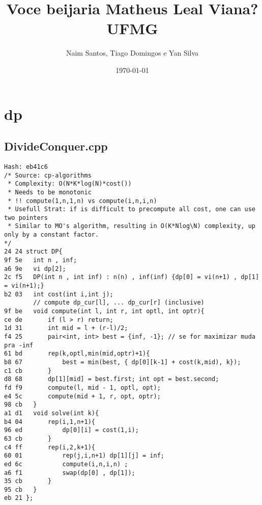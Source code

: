 \documentclass[11pt, a4paper, twoside]{article}
\title{Voce beijaria Matheus Leal Viana? \\ UFMG}
\author{Naim Santos, Tiago Domingos e Yan Silva}
\begin{document}
\twocolumn
\date{\today}
\maketitle


\renewcommand{\contentsname}{Índice} %
\tableofcontents


%
%

\section{dp}

\subsection{DivideConquer.cpp}
\begin{lstlisting}
Hash: eb41c6
/* Source: cp-algorithms
 * Complexity: O(N*K*log(N)*cost())
 * Needs to be monotonic
 * !! compute(1,n,1,n) vs compute(i,n,i,n)  
 * Usefull Strat: if is difficult to precompute all cost, one can use two pointers
 * Similar to MO's algorithm, resulting in O(K*Nlog\N) complexity, up only by a constant factor.
*/
24 24 struct DP{
9f 5e 	int n , inf; 
a6 9e 	vi dp[2];
2c f5 	DP(int n , int inf) : n(n) , inf(inf) {dp[0] = vi(n+1) , dp[1] = vi(n+1);}
b2 03 	int cost(int i,int j);
      	// compute dp_cur[l], ... dp_cur[r] (inclusive) 
9f be 	void compute(int l, int r, int optl, int optr){
ce de 	    if (l > r) return;
1d 31 	    int mid = l + (r-l)/2;
f4 25 	    pair<int, int> best = {inf, -1}; // se for maximizar muda pra -inf
61 bd 	    rep(k,optl,min(mid,optr)+1){
b8 67 	        best = min(best, { dp[0][k-1] + cost(k,mid), k});
c1 cb 	    }
d8 68 	    dp[1][mid] = best.first; int opt = best.second;
fd f9 	    compute(l, mid - 1, optl, opt);
e4 5c 	    compute(mid + 1, r, opt, optr);
98 cb 	}
a1 d1 	void solve(int k){
b4 04 		rep(i,1,n+1){
96 ed 			dp[0][i] = cost(1,i);
63 cb 		}
c4 ff 		rep(i,2,k+1){
60 01 			rep(j,i,n+1) dp[1][j] = inf;
ed 6c 			compute(i,n,i,n) ;
a6 f1 			swap(dp[0] , dp[1]);
35 cb 		}
95 cb 	}
eb 21 };
\end{lstlisting}
\end{document}
